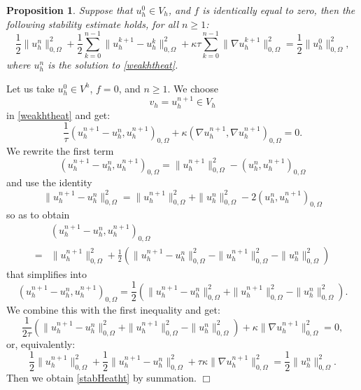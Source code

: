 \documentclass{article}
\newtheorem{proposition}{Proposition}
\begin{document}
\begin{proposition}
Suppose that $u_h^0 \in V_h$, and $f$ is identically equal to zero, then the following stability estimate holds, for all $n\geq1$:
\begin{equation}
    \label{stabHeatht}
    \frac12 
    \| u_h^n \|^2_{0,\Omega}
    + 
    \frac12 \sum_{k=0}^{n-1}
    \| u_h^{k+1} - u_h^k \|^2_{0,\Omega}
    + \kappa \tau \sum_{k=0}^{n-1}
    \| \nabla u_h^{k+1} \|^2_{0,\Omega} 
    =
    \frac12 
    \| u^0_h \|^2_{0,\Omega},
\end{equation}
where $u_h^n$ is the solution to \eqref{weakhtheat}.
\end{proposition}

 Let us take $u_h^0 \in V^h$, $f=0$, and $n\geq1$. We choose 
\[
v_h = u_h^{n+1} \in V_h
\]
in \eqref{weakhtheat} and get:
\[
  \frac{1}{\tau} (u_h^{n+1} - u_h^n,u_h^{n+1})_{0,\Omega} 
    + \kappa (\nabla u_h^{n+1}, \nabla u_h^{n+1})_{0,\Omega} = 0. %
\]
We rewrite the first term
\[
(u_h^{n+1} - u_h^n,u_h^{n+1})_{0,\Omega} =
\| u_h^{n+1} \|^2_{0,\Omega} - (u_h^n,u_h^{n+1})_{0,\Omega}
\]
and use the identity
\[
\| u_h^{n+1} - u_h^n \|^2_{0,\Omega}
= \| u_h^{n+1} \|^2_{0,\Omega} + \| u_h^n \|^2_{0,\Omega} - 2 (u_h^n,u_h^{n+1})_{0,\Omega}
\]
so as to obtain
\begin{align*}
& (u_h^{n+1} - u_h^n,u_h^{n+1})_{0,\Omega} \\ =& 
\| u_h^{n+1} \|^2_{0,\Omega} + \frac12 \left ( 
\| u_h^{n+1} - u_h^n \|^2_{0,\Omega}
- \| u_h^{n+1} \|^2_{0,\Omega} - \| u_h^n \|^2_{0,\Omega}
\right ) 
\end{align*}
that simplifies into
\[
(u_h^{n+1} - u_h^n,u_h^{n+1})_{0,\Omega} =
\frac12 \left ( 
\| u_h^{n+1} - u_h^n \|^2_{0,\Omega}
+ \| u_h^{n+1} \|^2_{0,\Omega} - \| u_h^n \|^2_{0,\Omega}
\right ).
\]
We combine this with the first inequality and get:
\[
  \frac{1}{2\tau} \left ( \| u_h^{n+1} - u_h^n \|^2_{0,\Omega}
+ \| u_h^{n+1} \|^2_{0,\Omega} - \| u_h^n \|^2_{0,\Omega}
\right )
    + \kappa \| \nabla u_h^{n+1} \|^2_{0,\Omega} = 0, %
\]
or, equivalently:
\[
  \frac{1}{2} \| u_h^{n+1} \|^2_{0,\Omega} 
+ \frac{1}{2} \| u_h^{n+1} - u_h^n \|^2_{0,\Omega}
    + \tau \kappa \| \nabla u_h^{n+1} \|^2_{0,\Omega} = 
      \frac{1}{2} \| u_h^n \|^2_{0,\Omega}.
\]
Then we obtain \eqref{stabHeatht} by summation. $\Box$
\end{document}
